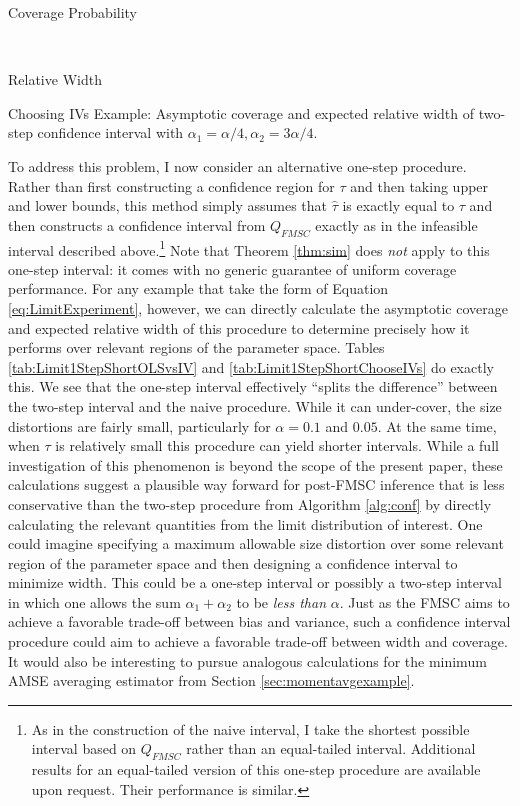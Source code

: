 \begin{table}[h]
  \centering
  \begin{subtable}{0.48\textwidth}
    \caption{Coverage Probability}
    
  \end{subtable}
  ~
  \begin{subtable}{0.48\textwidth}
    \caption{Relative Width}
    
  \end{subtable}
  \caption{Choosing IVs Example: Asymptotic coverage and expected relative width of two-step confidence interval with $\alpha_1 = \alpha/4,  \alpha_2 = 3\alpha/4$.}
  \label{tab:Limit2StepWideTauChooseIVs}
\end{table}

To address this problem, I now consider an alternative one-step procedure.
Rather than first constructing a confidence region for $\tau$ and then taking upper and lower bounds, this method simply assumes that $\widehat{\tau}$ is exactly equal to $\tau$ and then constructs a confidence interval from $Q_{FMSC}$ exactly as in the infeasible interval described above.\footnote{As in the construction of the naive interval, I take the shortest possible interval based on $Q_{FMSC}$ rather than an equal-tailed interval. Additional results for an equal-tailed version of this one-step procedure are available upon request. Their performance is similar.}
Note that Theorem \ref{thm:sim} does \emph{not} apply to this one-step interval: it comes with no generic guarantee of uniform coverage performance.
For any example that take the form of Equation \ref{eq:LimitExperiment}, however, we can directly calculate the asymptotic coverage and expected relative width of this procedure to determine precisely how it performs over relevant regions of the parameter space.
Tables \ref{tab:Limit1StepShortOLSvsIV} and \ref{tab:Limit1StepShortChooseIVs} do exactly this.
We see that the one-step interval effectively ``splits the difference'' between the two-step interval and the naive procedure. 
While it can under-cover, the size distortions are fairly small, particularly for $\alpha=0.1$ and $0.05$.
At the same time, when $\tau$ is relatively small this procedure can yield shorter intervals.
While a full investigation of this phenomenon is beyond the scope of the present paper, these calculations suggest a plausible way forward for post-FMSC inference that is less conservative than the two-step procedure from Algorithm \ref{alg:conf} by directly calculating the relevant quantities from the limit distribution of interest.
One could imagine specifying a maximum allowable size distortion over some relevant region of the parameter space and then designing a confidence interval to minimize width.
This could be a one-step interval or possibly a two-step interval in which one allows the sum $\alpha_1 + \alpha_2$ to be \emph{less than} $\alpha$.
Just as the FMSC aims to achieve a favorable trade-off between bias and variance, such a confidence interval procedure could aim to achieve a favorable trade-off between width and coverage.
It would also be interesting to pursue analogous calculations for the minimum AMSE averaging estimator from Section \ref{sec:momentavgexample}.

